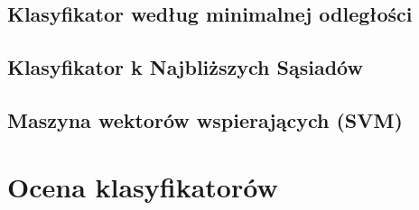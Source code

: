 	\subsection{Klasyfikator według minimalnej odległości}
	
	\subsection{Klasyfikator k Najbliższych Sąsiadów}

	\subsection{Maszyna wektorów wspierających (SVM)}
	
\section{Ocena klasyfikatorów}

